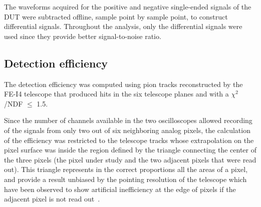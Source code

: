 		The waveforms acquired for the positive and negative single-ended signals of the DUT were subtracted offline, sample point by sample point, to construct differential signals. Throughout the analysis, only the differential signals were used since they provide better signal-to-noise ratio. 


		\subsection{Detection efficiency}\label{sec:efficiency}

		The detection efficiency was computed using pion tracks reconstructed by the FE-I4 telescope that produced hits in the six telescope planes and with a $\chi^2$/NDF $\le$ 1.5.

		Since the number of channels available in the two oscilloscopes allowed recording of the signals from only two out of six neighboring analog pixels, the calculation of the efficiency was restricted to the telescope tracks whose extrapolation on the pixel surface was inside  the region defined by the triangle connecting the center of the three pixels (the pixel under study and the  two adjacent pixels that were read out). This triangle represents in the correct proportions all the areas of a pixel, and provide a result unbiased by the pointing resolution of the telescope which have been observed to show artificial inefficiency at the edge of pixels if the adjacent pixel is not read out~\cite{Zambito_2023}.

